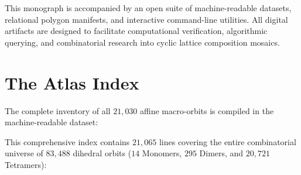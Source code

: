 
This monograph is accompanied by an open suite of machine-readable datasets, relational polygon manifests, and interactive command-line utilities. All digital artifacts are designed to facilitate computational verification, algorithmic querying, and combinatorial research into cyclic lattice composition mosaics.

\section{The Atlas Index}
\label{sec:atlas-index}

The complete inventory of all $21{,}030$ affine macro-orbits is compiled in the machine-readable dataset:
\begin{center}
\end{center}
This comprehensive index contains $21{,}065$ lines covering the entire combinatorial universe of $83{,}488$ dihedral orbits ($14$ Monomers, $295$ Dimers, and $20{,}721$ Tetramers):

